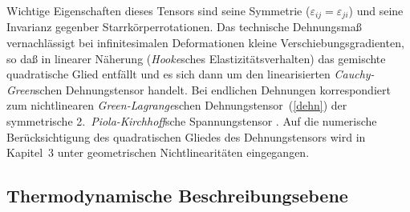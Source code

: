 Wichtige Eigenschaften dieses Tensors sind seine Symmetrie
($\varepsilon_{ij} = \varepsilon_{ji}$) und seine Invarianz
gegenber Starrkörperrotationen. Das technische Dehnungsmaß
vernachlässigt bei infinitesimalen Deformationen kleine
Verschiebungsgradienten, so daß in linearer Näherung ({\sl Hooke}\/sches
Elastizitätsverhalten) das gemischte quadratische Glied entfällt
und es sich dann um den linearisierten {\sl Cauchy-Green}\/schen
Dehnungstensor handelt. Bei endlichen Dehnungen korrespondiert zum
nichtlinearen {\sl Green-Lagrange}\/schen Dehnungstensor~(\ref{dehn})
der symmetrische 2.\ {\sl Piola-Kirchhoff}\/sche Spannungstensor
\cite{Bat82}. Auf die numerische
Berücksichtigung des quadratischen Gliedes des Dehnungstensors wird in
Kapitel~3 unter geometrischen Nichtlinearitäten eingegangen.


\subsection{Thermodynamische Beschreibungsebene}
\label{thermodynamik}

